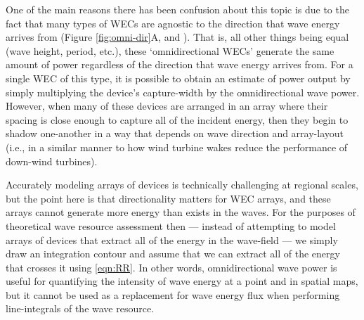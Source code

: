 One of the main reasons there has been confusion about this topic is due to the fact that many types of WECs are agnostic to the direction that wave energy arrives from (Figure \ref{fig:omni-dir}A, and \cite{EPRIwaveresource2011} ). That is, all other things being equal (wave height, period, etc.), these `omnidirectional WECs' generate the same amount of power regardless of the direction that wave energy arrives from. For a single WEC of this type, it is possible to obtain an estimate of power output by simply multiplying the device's capture-width by the omnidirectional wave power. However, when many of these devices are arranged in an array where their spacing is close enough to capture all of the incident energy, then they begin to shadow one-another in a way that depends on wave direction and array-layout (i.e., in a similar manner to how wind turbine wakes reduce the performance of down-wind turbines).

Accurately modeling arrays of devices is technically challenging at regional scales, but the point here is that directionality matters for WEC arrays, and these arrays cannot generate more energy than exists in the waves. For the purposes of theoretical wave resource assessment then — instead of attempting to model arrays of devices that extract all of the energy in the wave-field — we simply draw an integration contour and assume that we can extract all of the energy that crosses it using \eqref{eqn:RR}. In other words, omnidirectional wave power is useful for quantifying the intensity of wave energy at a point and in spatial maps, but it cannot be used as a replacement for wave energy flux when performing line-integrals of the wave resource.

